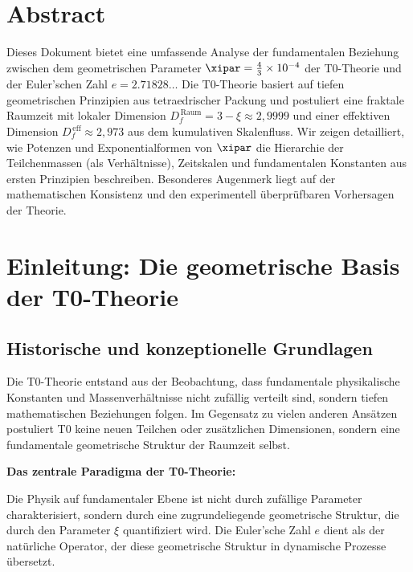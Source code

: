 \section*{Abstract}
		Dieses Dokument bietet eine umfassende Analyse der fundamentalen Beziehung zwischen dem geometrischen Parameter $\xipar = \frac{4}{3} \times 10^{-4}$ der T0-Theorie und der Euler'schen Zahl $e = 2.71828\ldots$ Die T0-Theorie basiert auf tiefen geometrischen Prinzipien aus tetraedrischer Packung und postuliert eine fraktale Raumzeit mit lokaler Dimension $D_f^{\,\text{Raum}} = 3 - \xi \approx 2{,}9999$ und einer effektiven Dimension $D_f^{\,\text{eff}} \approx 2{,}973$ aus dem kumulativen Skalenfluss. Wir zeigen detailliert, wie Potenzen und Exponentialformen von $\xipar$ die Hierarchie der Teilchenmassen (als Verhältnisse), Zeitskalen und fundamentalen Konstanten aus ersten Prinzipien beschreiben. Besonderes Augenmerk liegt auf der mathematischen Konsistenz und den experimentell überprüfbaren Vorhersagen der Theorie.

	
	
	\section{Einleitung: Die geometrische Basis der T0-Theorie}
	
	\subsection{Historische und konzeptionelle Grundlagen}
	
	Die T0-Theorie entstand aus der Beobachtung, dass fundamentale physikalische Konstanten und Massenverhältnisse nicht zufällig verteilt sind, sondern tiefen mathematischen Beziehungen folgen. Im Gegensatz zu vielen anderen Ansätzen postuliert T0 keine neuen Teilchen oder zusätzlichen Dimensionen, sondern eine fundamentale geometrische Struktur der Raumzeit selbst.
	
	\begin{erkenntnis}
		\textbf{Das zentrale Paradigma der T0-Theorie:}
		
		Die Physik auf fundamentaler Ebene ist nicht durch zufällige Parameter charakterisiert, sondern durch eine zugrundeliegende geometrische Struktur, die durch den Parameter $\xi$ quantifiziert wird. Die Euler'sche Zahl $e$ dient als der natürliche Operator, der diese geometrische Struktur in dynamische Prozesse übersetzt.
	\end{erkenntnis}
	
